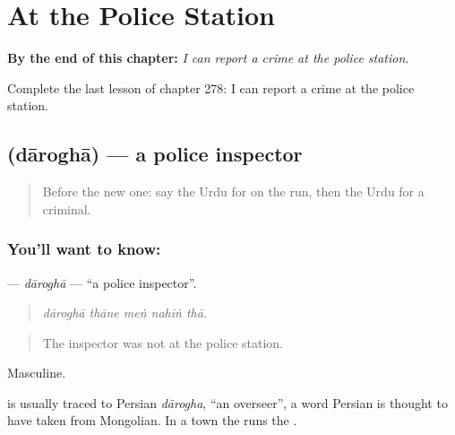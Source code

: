 
\chapter{At the Police Station}
\label{ch:ur-at-the-police-station}

\begin{chapteropening}
\textbf{By the end of this chapter:} \emph{I can report a crime at the police station.}

Complete the last lesson of chapter 278: I can report a crime at the police station.
\end{chapteropening}

\section[\texorpdfstring{\ur{داروغہ} (dāroghā)}{داروغہ (dāroghā)}]{ (dāroghā) — a police inspector}

\label{lesson:UR-C278-darogha}



\begin{quote}
Before the new one: say the Urdu for on the run, then the Urdu for a criminal.
\end{quote}

\subsection*{You'll want to know: }
\textbf{} — \emph{dāroghā} — \textquotedblleft{}a police inspector\textquotedblright{}.

\begin{quote}
    
\end{quote}

\begin{quote}
\emph{dāroghā thāne meṅ nahīṅ thā.}
\end{quote}

\begin{quote}
The inspector was not at the police station.
\end{quote}

Masculine.

\begin{cousinweb}
is usually traced to Persian \emph{dārogha}, \textquotedblleft{}an overseer\textquotedblright{}, a word Persian is thought to have taken from Mongolian. In a town the \textbf{} runs the \textbf{}.
\end{cousinweb}

